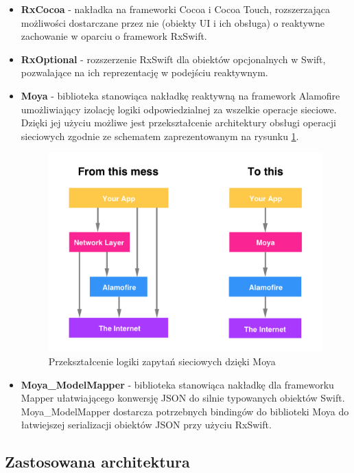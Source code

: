 \documentclass[12pt,oneside,a4paper]{report}
\begin{document}
\begin{itemize}
	\item  \textbf{RxCocoa} - nakładka na frameworki Cocoa i Cocoa Touch, rozszerzająca możliwości dostarczane przez nie (obiekty UI i ich obsługa) o reaktywne zachowanie w oparciu o framework RxSwift.  
	
	\item  \textbf{RxOptional} - rozszerzenie RxSwift dla obiektów opcjonalnych w Swift, pozwalające na ich reprezentację w podejściu reaktywnym.
	
	\item  \textbf{Moya} - biblioteka stanowiąca nakładkę reaktywną na framework Alamofire \cite{alamofire} umożliwiający izolację logiki odpowiedzialnej za wszelkie operacje sieciowe. Dzięki jej użyciu możliwe jest przekształcenie architektury obsługi operacji sieciowych zgodnie ze schematem zaprezentowanym na rysunku \ref{moyaDiagram}.
	\begin{figure}[ht!]
		\centering
		\includegraphics[width=13cm]{moyaDiagram}
		\caption{Przekształcenie logiki zapytań sieciowych dzięki Moya\cite{moyaScheme}}
		\label{moyaDiagram}
	\end{figure}

	\item  \textbf{Moya\_ModelMapper} - biblioteka stanowiąca nakładkę dla frameworku Mapper \cite{mapper} ułatwiającego konwersję JSON do silnie typowanych obiektów Swift. Moya\_ModelMapper dostarcza potrzebnych bindingów do biblioteki Moya do łatwiejszej serializacji obiektów JSON przy użyciu RxSwift.
\end{itemize}
\pagebreak
\subsection{Zastosowana architektura}
\end{document}
